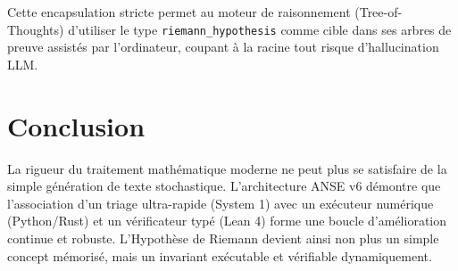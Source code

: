\documentclass[11pt, a4paper]{article}
\begin{document}
Cette encapsulation stricte permet au moteur de raisonnement (Tree-of-Thoughts) d'utiliser le type \texttt{riemann\_hypothesis} comme cible dans ses arbres de preuve assistés par l'ordinateur, coupant à la racine tout risque d'hallucination LLM.

\section{Conclusion}
La rigueur du traitement mathématique moderne ne peut plus se satisfaire de la simple génération de texte stochastique. L'architecture ANSE v6 démontre que l'association d'un triage ultra-rapide (System 1) avec un exécuteur numérique (Python/Rust) et un vérificateur typé (Lean 4) forme une boucle d'amélioration continue et robuste. L'Hypothèse de Riemann devient ainsi non plus un simple concept mémorisé, mais un invariant exécutable et vérifiable dynamiquement.
\end{document}
